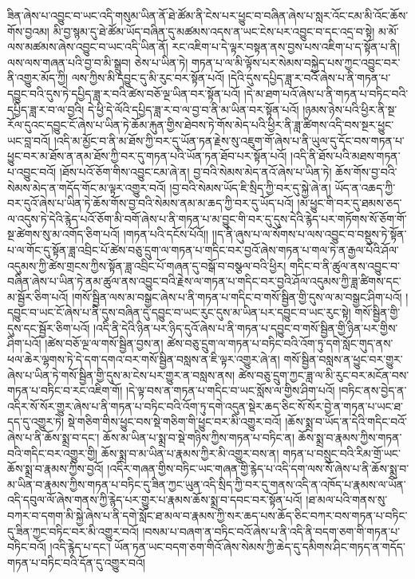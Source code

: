 ཟིན་ཞེས་པ་འབྱུང་བ་ཡང་འདི་གསུམ་ཡིན་ནོ་ཐེ་ཚོམ་ནི་ངེས་པར་ཕྱུང་བ་བཞིན་ཞེས་པ་སླར་འོང་ངམ་མི་འོང་ཆོས་གོས་བྱའམ། མི་བྱ་སྙམ་དུ་ཐེ་ཚོམ་ཡོད་བཞིན་དུ་མཚམས་འདས་ན་ཡང་ངེས་པར་འབྱུང་བ་དང་འདྲ་བ་སྟེ། མ་མོ་ལས་མཚམས་ཞེས་འབྱུང་བ་ཡང་འདི་ཡིན་ནོ། རང་འཇིག་པ་དེ་ལྟར་བསྟན་ནས་བྱས་པས་འཇིག་པ་ད་སྟོན་པ་ནི། ལས་ལས་གཞན་པའི་བྱ་བ་མི་སྒྲུབ། ཅེས་པ་ཡིན་ཏེ། གཏན་པ་ལ་མི་ལྟོས་པར་སེམས་བསྐྱེད་པས་ཀྱང་འབྱུང་བར་ནི་འགྱུར་མོད་ཀྱི། ལས་ཀྱིས་མི་དབྱུང་དུ་མི་རུང་བར་སྟོན་པའོ། །དེའི་དུས་དཔྱིད་ཟླ་ར་བའོ་ཞེས་པ་ནི་གཏན་པ་དབྱུང་བའི་དུས་ཏེ་དཔྱིད་ཟླ་ར་བའི་ཚེས་བཅོ་ལྔ་ཡིན་བར་སྟོན་པའོ། །དེ་མ་ཐག་པའོ་ཞེས་པ་ནི་གཏན་པ་བཏིང་བའི་དཔྱིད་ཟླ་ར་བ་ལ་བྱའི། དེ་ཕྱི་དེ་ལོའི་དཔྱིད་ཟླ་ར་བ་ལ་བྱ་བ་ནི་མ་ཡིན་བར་སྟོན་པའོ། །ཉམས་ཉེས་པའི་ཕྱིར་ནི་སྔ་རོལ་དུའང་དབྱུང་ངོ་ཞེས་པ་ཡིན་ཏེ་ཆོམ་རྐུན་གྱིས་ཐེབས་ཏེ་གོས་མེད་པའི་ཕྱིར་ནི་ཟླ་ཚིགས་འདི་བས་སྔར་ཕྱུང་ཡང་བླ་བའོ། །འདི་མ་མྱོང་བ་ནི་མ་ཐོས་ཀྱི་བར་དུ་ཡོན་ཏན་རྗེས་སུ་འཇུག་གོ་ཞེས་པ་ནི་ཡུལ་དུ་དོང་བས་གཏན་པ་ཕྱུང་བར་མ་ཐོས་ན་ནམ་ཐོས་ཀྱི་བར་དུ་གཏན་པའི་ཡོན་ཏན་ཐོབ་པར་སྟོན་པའོ། །འདི་ནི་ཐོས་པའི་མཐས་གཏན་པ་འབྱུང་བའོ། །ཐོས་པའོ་ཅོག་གིས་འབྱུང་ངམ་ཞེ་ན། བྱ་བའི་སེམས་མེད་ནའོ་ཞེས་པ་ཡིན་ཏེ། ཆོས་གོས་བྱ་བའི་སེམས་མེད་ན་གདོད་གོང་མ་ལྟར་འགྱུར་བའོ། །བྱ་བའི་སེམས་ཡོད་ཇི་སྲིད་ཀྱི་བར་དུ་སྐྱེ་ཞེ་ན། ཡོད་ན་འཆད་ཀྱི་བར་དུའོ་ཞེས་པ་ཡིན་ཏེ་ཆོས་གོས་བྱ་བའི་སེམས་ནམ་མ་ཆད་ཀྱི་བར་དུ་ཡོད་པའོ། །མ་ཕྱུང་གི་བར་དུ་ཐམས་ཅད་ལ་འདུས་ཏེ་དེའི་རྙེད་པའོ་ཅོག་མི་བགོ་ཞེས་པ་ནི་གཏན་པ་མ་བྱུང་གི་བར་དུ་དུས་དེའི་རྙེད་པར་གཏོགས་སོ་ཅོག་གོ་སྔ་ཚེགས་སུ་མ་འགོད་ཅིག་པའོ། །གཏན་པའི་དངོས་པོའོ།། །།ད་ནི་ཞུས་པ་ལ་སོགས་པ་ལས་འབྱུང་བ་བསྡུས་ཏེ་སྟོན་པ་ལ་གོང་དུ་སྟོན་ཟླ་འབྲིང་པོ་ཚེས་བཅུ་དྲུག་ལ་གཏན་པ་གདིང་བར་བྱའོ་ཞེས་གཏན་པ་གལ་ཏེ་ན་རྒྱལ་པོའི་ཤོལ་འདུམས་ཀྱི་ཚེས་གྲངས་ཀྱིས་སྟོན་ཟླ་འབྲིང་པོ་གཞན་དུ་བསྒོ་བ་བསྩལ་བའི་ཕྱིར། གདིང་བ་ནི་ཚུལ་ནས་འབྱུང་བ་བཞིན་ཞེས་པ་ཡིན་ཏེ་ནམ་ཚུལ་ནས་འབྱུང་བའི་རྗེས་ལ་གཏན་པ་གདིང་བར་བྱའི་ཤོལ་འདུམས་ཀྱི་ཟླ་ཚིགས་དང་མ་སྦྱོར་ཅིག་པའོ། །གསོ་སྦྱིན་ལས་མ་བསྒྱང་ཞེས་པ་ནི་གཏན་པ་གདིང་བ་གསོ་སྦྱིན་གྱི་དུས་ལ་མ་བསྒྱང་ཤིག་པའོ། །དབྱུང་བ་ཡང་ངོ་ཞེས་པ་ནི་དུས་བཞིན་དུ་དབྱུང་བ་ཡང་རུང་དུས་མ་ཡིན་པར་དབྱུང་བ་ཡང་རུང་སྟེ། གསོ་སྦྱིན་གྱི་དུས་དང་སྦྱོར་ཅིག་པའོ། །འདི་ནི་དེའི་ཉིན་པར་ཉིད་དུའོ་ཞེས་པ་ནི་གཏན་པ་དབྱུང་བ་གསོ་སྦྱིན་གྱི་ཉིན་པར་གྱིས་ཤིག་པའོ། །ཚེས་བཅོ་ལྔ་ལ་གསོ་སྦྱིན་བྱས་ན། ཚེས་བཅུ་དྲུག་ལ་གཏན་པ་བཏིང་བའི་འོག་ཏུ་དགེ་སློང་གུད་ནས་ཕལ་ཆེར་ལྷགས་ཏེ་དེ་དག་དགའ་བར་གསོ་སྦྱིན་བསླས་ན་ཇི་ལྟར་འགྱུར་ཞེ་ན། གསོ་སྦྱིན་བསླས་ན་ཕྱུང་བར་གྱུར་ཞེས་པ་ཡིན་ཏེ་གསོ་སྦྱིན་གྱི་དུས་མ་ངེས་པར་གྱུར་ན་བསླས་ནས། ཚེས་བཅུ་དྲུག་ཀྱང་ཟླ་ལ་མི་རུང་བར་མངོན་བས་གཏན་པ་བཏིང་བ་རང་འཇིག་གོ། །དེ་ལྟ་བས་ན་གཏན་པ་གདིང་བ་ཡང་སློས་ལ་གྱིས་ཤིག་པའོ། །བཏིང་ནས་བྱེད་ན་འདིར་སོ་སོར་གྱུར་ཞེས་པ་ནི་གཏན་པ་བཏིང་བའི་འོག་ཏུ་དགེ་འདུན་སྡེར་ཆད་ཅིང་སོ་སོར་བྱེ་ན་གཏན་པ་ཡང་ཐ་དད་དུ་འགྱུར་ཏེ། སྡེ་གཅིག་གིས་ཕྱུང་བས་སྡེ་གཅིག་གི་ཕྱུང་བར་མི་འགྱུར་བའོ། །ཆོས་སྨྲ་བ་ཡོད་ན་དེའི་གདིང་བའོ་ཞེས་པ་ནི་ཆོས་སྨྲ་བ་དང་། ཆོས་མ་ཡིན་པ་སྨྲ་བ་སྡེ་གཉིས་ཀྱིས་གཏན་པ་བཏིང་ན། ཆོས་སྨྲ་བ་རྣམས་ཀྱིས་གཏན་བའི་གདིང་བར་འགྱུར་གྱི། ཆོས་སྨྲ་བ་མ་ཡིན་པ་རྣམས་ཀྱིར་མི་འགྱུར་བས་ན། གཏན་པ་བསྲུང་བའི་རིམ་གྲོ་ཡང་ཆོས་སྨྲ་བ་རྣམས་ཀྱིས་བྱའོ། །འདིར་གཞན་གྱིས་བཏིང་ཡང་གཞན་གྱི་རྙེད་པ་འདི་དག་ལས་སོ་ཞེས་པ་ནི་ཆོས་སྨྲ་བ་མ་ཡིན་བ་རྣམས་ཀྱིས་གཏན་པ་བཏིང་དུ་ཟིན་ཀྱང་ཡུན་འདི་སྲིད་ཀྱི་བར་དུ་གནས་འདི་ན་འཁོད་པ་རྣམས་ལ་ཡོན་འདི་དབུལ་ལོ་ཞེས་གནས་ཀྱི་རྙེད་པར་གྱུར་པ་རྣམས་ཆོས་སྨྲ་བ་དབང་བར་སྟོན་པའོ། །ཐ་མལ་པའི་གནས་སུ་བཀར་བ་དགག་མི་སྐྱེ་ཞེས་པ་ནི་དགེ་སློང་ཐ་མལ་བ་རྣམས་ཀྱི་སར་ཆད་པས་ཆོད་ཅིང་བཀར་བས་གཏན་པ་བཏིང་དུ་ཟིན་ཀྱང་བཏིང་བར་མི་འགྱུར་བའོ། །བསམ་པ་བཞག་ན་བཏིང་བའོ་ཞེས་པ་ནི་འདི་ནི་བདག་ཅག་གི་གཏན་པ་བཏིང་བའོ། །འདི་རྙེད་པ་དང་། ཡོན་ཏན་ཡང་བདག་ཅག་གིའོ་ཞེས་སེམས་ཀྱི་ཆེད་དུ་དམིགས་ཤིང་གཏད་ན་གདོད་གཏན་པ་བཏིང་བའི་དོན་དུ་འགྱུར་བའོ། 